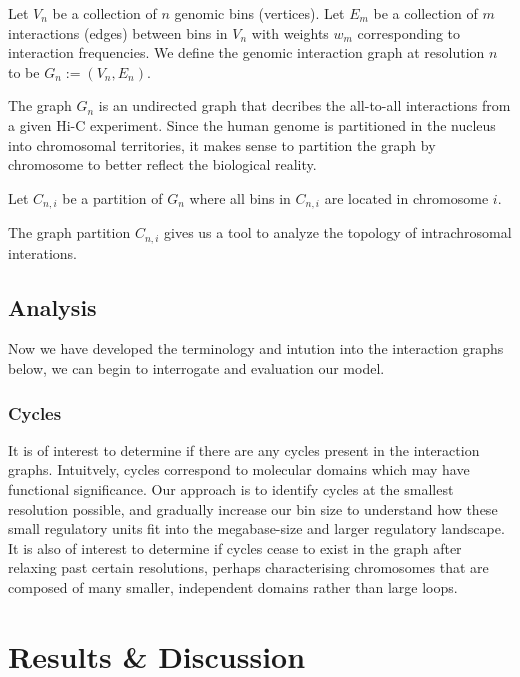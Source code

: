 \documentclass[phd,tocprelim]{cornell}
\begin{document}
\begin{definition}
  Let $V_{n}$ be a collection of $n$ genomic bins (vertices).  Let $E_{m}$ be a
  collection of $m$ interactions (edges) between bins in $V_{n}$ with weights
  $w_{m}$ corresponding to interaction frequencies.  We define the  genomic
  interaction graph at resolution $n$ to be $G_{n} := (V_{n}, E_{n})$.
\end{definition}

The graph $G_{n}$ is an undirected graph that decribes the all-to-all
interactions from a given Hi-C experiment.  Since the human genome is
partitioned in the nucleus into chromosomal territories, it makes sense to
partition the graph by chromosome to better reflect the biological reality.

\begin{definition}
  Let $C_{n,i}$ be a partition of $G_{n}$ where all bins in $C_{n,i}$ are
  located in chromosome $i$.
\end{definition}

The graph partition $C_{n,i}$ gives us a tool to analyze the topology of
intrachrosomal interations.

\section{Analysis}

Now we have developed the terminology and intution into the interaction
graphs below, we can begin to interrogate and evaluation our model.

\subsection{Cycles}

It is of interest to determine if there are any cycles present in the
interaction graphs.  Intuitvely, cycles correspond to molecular domains which
may have functional significance.  Our approach is to identify cycles at the
smallest resolution possible, and gradually increase our bin size to understand
how these small regulatory units fit into the megabase-size and larger regulatory
landscape.  It is also of interest to determine if cycles cease to exist in the
graph after relaxing past certain resolutions, perhaps characterising chromosomes
that are composed of many smaller, independent domains rather than large loops.



\chapter{Results & Discussion}
\end{document}
